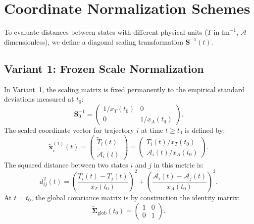 \documentclass[11pt,a4paper]{article}
\begin{document}
\section{Coordinate Normalization Schemes}
\label{sec:normalization_schemes}
To evaluate distances between states with different physical units ($T$ in $\mathrm{fm}^{-1}$, $\mathcal{A}$ dimensionless), we define a diagonal scaling transformation $\mathbf{S}^{-1}(t)$.

\subsection{Variant 1: Frozen Scale Normalization}
In Variant~1, the scaling matrix is fixed permanently to the empirical standard deviations measured at $t_0$:
\begin{equation}
    \mathbf{S}_0^{-1} = \begin{pmatrix} 1/x_T(t_0) & 0 \\ 0 & 1/x_A(t_0) \end{pmatrix}.
\end{equation}
The scaled coordinate vector for trajectory $i$ at time $t \ge t_0$ is defined by:
\begin{equation}
    \tilde{\mathbf{x}}_i^{(1)}(t) = \begin{pmatrix} \tilde{T}_i(t) \\ \tilde{\mathcal{A}}_i(t) \end{pmatrix} = \begin{pmatrix} T_i(t) / x_T(t_0) \\ \mathcal{A}_i(t) / x_A(t_0) \end{pmatrix}.
    \label{eq:var1_def}
\end{equation}
The squared distance between two states $i$ and $j$ in this metric is:
\begin{equation}
    d_{ij}^2(t) = \left( \frac{T_i(t) - T_j(t)}{x_T(t_0)} \right)^2 + \left( \frac{\mathcal{A}_i(t) - \mathcal{A}_j(t)}{x_A(t_0)} \right)^2.
\end{equation}
At $t = t_0$, the global covariance matrix is by construction the identity matrix:
\begin{equation}
    \tilde{\mathbf{\Sigma}}_{\mathrm{glob}}(t_0) = \begin{pmatrix} 1 & 0 \\ 0 & 1 \end{pmatrix}.
\end{equation}
\end{document}
